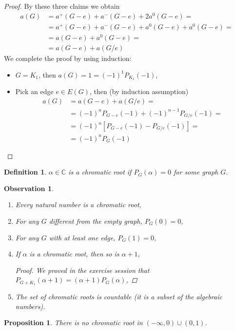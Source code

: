\documentclass[a4paper]{article}
\theoremstyle{plain}
\newtheorem{definition}[lemma]{Definition}
\newtheorem{proposition}[lemma]{Proposition}
\newtheorem{observation}[lemma]{Observation}
\theoremstyle{myremark}
\begin{document}
\begin{proof}
By these three claims we obtain
\begin{align*}
a(G)&=a^+(G-e)+a^-(G-e)+2a^0(G-e)= \\
&= a^+(G-e)+a^-(G-e)+a^0(G-e)+a^0(G-e)= \\
&= a(G-e)+a^0(G-e)= \\
&= a(G-e)+a(G/e)
\end{align*}
We complete the proof by using induction:
\begin{itemize}
\item $G=K_1$, then $a(G)=1=(-1)^1P_{K_1}(-1)$,
\item Pick an edge $e\in E(G)$, then (by induction assumption)
\begin{align*}
a(G)&=a(G-e)+a(G/e)= \\
&= (-1)^nP_{G-e}(-1)+(-1)^{n-1}P_{G/e}(-1)= \\
&= (-1)^n[P_{G-e}(-1)-P_{G/e}(-1)]= \\
&= (-1)^nP_G(-1)
\end{align*}
\end{itemize}
\end{proof}

\begin{definition} $\alpha \in \mathbb{C}$ is a \emph{chromatic root} if $P_G(\alpha)=0$ for some graph $G$.
\end{definition}

\begin{observation}
\begin{enumerate}
\item Every natural number is a chromatic root,
\item For any $G$ different from the empty graph, $P_G(0)=0$,
\item For any $G$ with at least one edge, $P_G(1)=0$,
\item If $\alpha$ is a chromatic root, then so is $\alpha+1$,
\begin{proof}
We proved in the exercise session that $P_{G+K_1}(\alpha+1)=(\alpha+1)P_G(\alpha)$,
\end{proof}
\item The set of chromatic roots is countable (it is a subset of the algebraic numbers).
\end{enumerate}
\end{observation}



\begin{proposition} There is no chromatic root in $(- \infty, 0)\cup (0,1)$.
\end{proposition}
\end{document}
